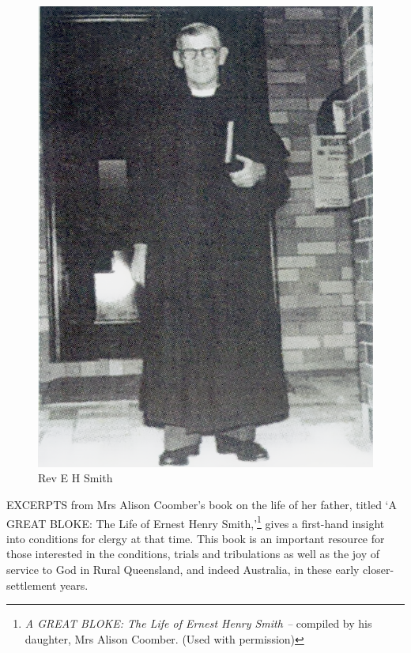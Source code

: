 \begin{figure}
\begin{center}
\includegraphics[width=1.\linewidth,center]{../images/EHSmith.png}
\caption{Rev E H Smith}
\end{center}
\end{figure}




\lettrine[lines=3]{E}{XCERPTS}
 from Mrs Alison Coomber's book on the life of her father, titled `A GREAT BLOKE: The Life of Ernest Henry Smith,'\footnote{\emph{A GREAT BLOKE: The Life of Ernest Henry Smith --} compiled by his daughter, Mrs Alison Coomber. (Used with permission)} gives a first-hand insight into conditions for clergy at that time. This book is an important resource for those interested in the conditions, trials and tribulations as well as the joy of service to God in Rural Queensland, and indeed Australia, in these early closer-settlement years.

